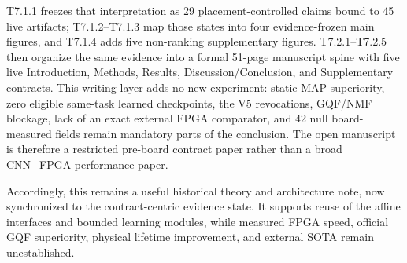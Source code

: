\documentclass[11pt]{article}
\begin{document}
T7.1.1 freezes that interpretation as 29 placement-controlled claims bound to
45 live artifacts; T7.1.2--T7.1.3 map those states into four evidence-frozen
main figures, and T7.1.4 adds five non-ranking supplementary figures.
T7.2.1--T7.2.5 then organize the same evidence into a formal 51-page manuscript
spine with five live Introduction, Methods, Results, Discussion/Conclusion, and
Supplementary contracts.  This
writing layer adds no new experiment: static-MAP superiority, zero eligible
same-task learned checkpoints, the V5 revocations, GQF/NMF blockage, lack of an
exact external FPGA comparator, and 42 null board-measured fields remain
mandatory parts of the conclusion.  The open manuscript is therefore a
restricted pre-board contract paper rather than a broad CNN+FPGA performance
paper.

Accordingly, this remains a useful historical theory and architecture note,
now synchronized to the contract-centric evidence state.  It supports reuse of
the affine interfaces and bounded learning modules, while measured FPGA speed,
official GQF superiority, physical lifetime improvement, and external SOTA
remain unestablished.
\end{document}
